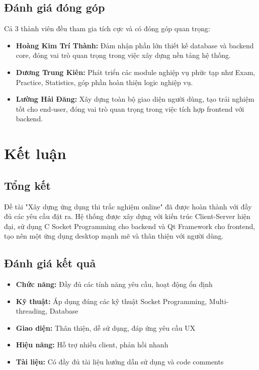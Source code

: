 \documentclass[12pt,a4paper]{report}
\begin{document}
\section{Đánh giá đóng góp}

Cả 3 thành viên đều tham gia tích cực và có đóng góp quan trọng:

\begin{itemize}
    \item \textbf{Hoàng Kim Trí Thành:} Đảm nhận phần lớn thiết kế database và backend core, đóng vai trò quan trọng trong việc xây dựng nền tảng hệ thống.
    \item \textbf{Dương Trung Kiên:} Phát triển các module nghiệp vụ phức tạp như Exam, Practice, Statistics, góp phần hoàn thiện logic nghiệp vụ.
    \item \textbf{Lường Hải Đăng:} Xây dựng toàn bộ giao diện người dùng, tạo trải nghiệm tốt cho end-user, đóng vai trò quan trọng trong việc tích hợp frontend với backend.
\end{itemize}

\chapter{Kết luận}

\section{Tổng kết}

Đề tài "Xây dựng ứng dụng thi trắc nghiệm online" đã được hoàn thành với đầy đủ các yêu cầu đặt ra. Hệ thống được xây dựng với kiến trúc Client-Server hiện đại, sử dụng C Socket Programming cho backend và Qt Framework cho frontend, tạo nên một ứng dụng desktop mạnh mẽ và thân thiện với người dùng.

\section{Đánh giá kết quả}

\begin{itemize}
    \item [$\checkmark$] \textbf{Chức năng:} Đầy đủ các tính năng yêu cầu, hoạt động ổn định
    \item [$\checkmark$] \textbf{Kỹ thuật:} Áp dụng đúng các kỹ thuật Socket Programming, Multi-threading, Database
    \item [$\checkmark$] \textbf{Giao diện:} Thân thiện, dễ sử dụng, đáp ứng yêu cầu UX
    \item [$\checkmark$] \textbf{Hiệu năng:} Hỗ trợ nhiều client, phản hồi nhanh
    \item [$\checkmark$] \textbf{Tài liệu:} Có đầy đủ tài liệu hướng dẫn sử dụng và code comments
\end{itemize}
\end{document}
